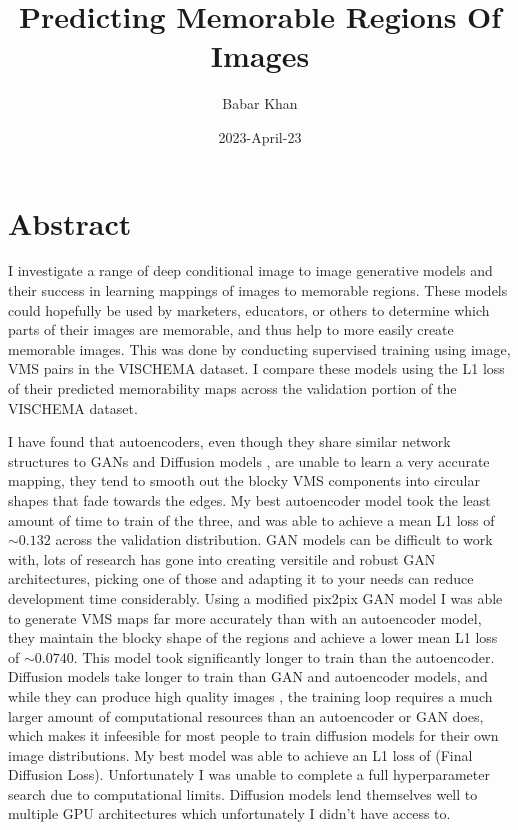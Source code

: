 \documentclass{UoYCSproject}
\author{Babar Khan}
\title{Predicting Memorable Regions Of Images}
\date{2023-April-23}
\begin{document}
\maketitle

\tableofcontents

\chapter{Abstract}

I investigate a range of deep conditional image to image generative models and their success in learning mappings of images to memorable regions. These models could hopefully be used by marketers, educators, or others to determine which parts of their images are memorable, and thus help to more easily create memorable images.
This was done by conducting supervised training using image, VMS pairs in the VISCHEMA dataset. I compare these models using the L1 loss of their predicted memorability maps across the validation portion of the VISCHEMA dataset.

I have found that autoencoders, even though they share similar network structures to GANs and Diffusion models \cite{ronneberger2015unet}, are unable to learn a very accurate mapping, they tend to smooth out the blocky VMS components into circular shapes that fade towards the edges. My best autoencoder model took the least amount of time to train of the three, and was able to achieve a mean L1 loss of \(\sim 0.132\) across the validation distribution. 
GAN models can be difficult to work with, lots of research has gone into creating versitile and robust GAN architectures, picking one of those and adapting it to your needs can reduce development time considerably. Using a modified pix2pix GAN model \cite{isola2018imagetoimage} I was able to generate VMS maps far more accurately than with an autoencoder model, they maintain the blocky shape of the regions and achieve a lower mean L1 loss of \(\sim 0.0740\). This model took significantly longer to train than the autoencoder.
Diffusion models take longer to train than GAN and autoencoder models, and while they can produce high quality images \cite{ramesh2022hierarchical, saharia2022photorealistic}, the training loop requires a much larger amount of computational resources than an autoencoder or GAN does, which makes it infeesible for most people to train diffusion models for their own image distributions. My best model was able to achieve an L1 loss of (Final Diffusion Loss). Unfortunately I was unable to complete a full hyperparameter search due to computational limits. Diffusion models lend themselves well to multiple GPU architectures which unfortunately I didn't have access to. 
\end{document}
